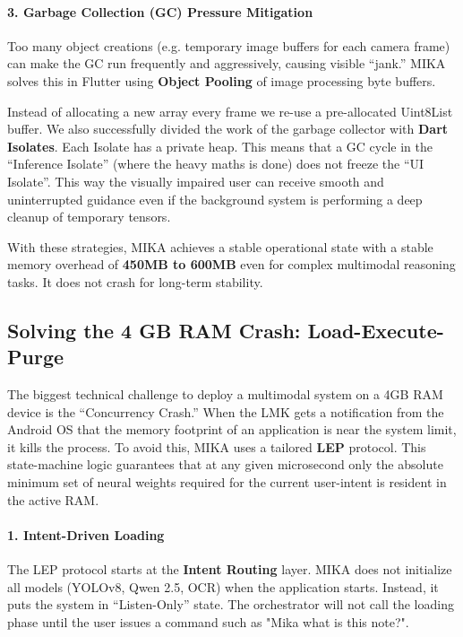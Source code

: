 \documentclass[12pt,a4paper]{report}
\begin{document}
\paragraph{3. Garbage Collection (GC) Pressure Mitigation}
Too many object creations (e.g. temporary image buffers for each camera frame) can make the GC run frequently and aggressively, causing visible “jank.” MIKA solves this in Flutter using \textbf{Object Pooling} of image processing byte buffers.


\noindent Instead of allocating a new array every frame we re-use a pre-allocated Uint8List buffer. We also successfully divided the work of the garbage collector with \textbf{Dart Isolates}. Each Isolate has a private heap. This means that a GC cycle in the “Inference Isolate” (where the heavy maths is done) does not freeze the “UI Isolate”. This way the visually impaired user can receive smooth and uninterrupted guidance even if the background system is performing a deep cleanup of temporary tensors.
 
\noindent  With these strategies, MIKA achieves a stable operational state with a stable memory overhead of \textbf{450MB to 600MB} even for complex multimodal reasoning tasks. It does not crash for long-term stability.
 
\subsection{Solving the 4 GB RAM Crash: Load-Execute-Purge}
 
The biggest technical challenge to deploy a multimodal system on a 4GB RAM device is the “Concurrency Crash.” When the LMK gets a notification from the Android OS that the memory footprint of an application is near the system limit, it kills the process. To avoid this, MIKA uses a tailored \textbf{LEP} protocol. This state-machine logic guarantees that at any given microsecond only the absolute minimum set of neural weights required for the current user-intent is resident in the active RAM.

 
\paragraph{1. Intent-Driven Loading}
The LEP protocol starts at the \textbf{Intent Routing} layer. MIKA does not initialize all models (YOLOv8, Qwen 2.5, OCR) when the application starts. Instead, it puts the system in “Listen-Only” state. The orchestrator will not call the loading phase until the user issues a command such as "Mika what is this note?".
\end{document}
